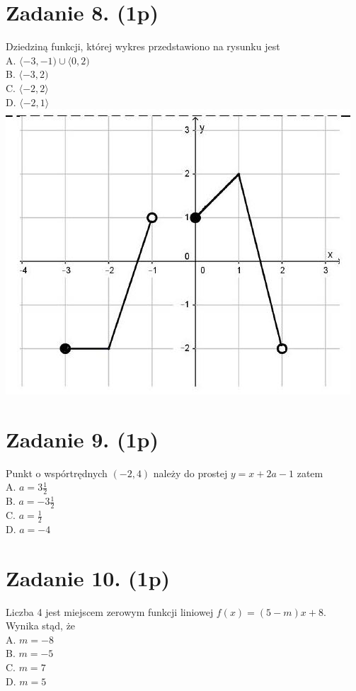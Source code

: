 \documentclass[10pt]{article}
\begin{document}
\section*{Zadanie 8. (1p)}
Dziedziną funkcji, której wykres przedstawiono na rysunku jest\\
A. \(\langle-3,-1) \cup\langle 0,2)\)\\
B. \(\langle-3,2)\)\\
C. \(\langle-2,2\rangle\)\\
D. \(\langle-2,1\rangle\)\\
\includegraphics[max width=\textwidth, center]{2024_11_21_d45b0573b36a3462565cg-04(1)}

\section*{Zadanie 9. (1p)}
Punkt o wspórtrędnych \((-2,4)\) należy do prostej \(y=x+2 a-1\) zatem\\
A. \(a=3 \frac{1}{2}\)\\
B. \(a=-3 \frac{1}{2}\)\\
C. \(a=\frac{1}{2}\)\\
D. \(a=-4\)

\section*{Zadanie 10. (1p)}
Liczba 4 jest miejscem zerowym funkcji liniowej \(f(x)=(5-m) x+8\). Wynika stąd, że\\
A. \(m=-8\)\\
B. \(m=-5\)\\
C. \(m=7\)\\
D. \(m=5\)
\end{document}
